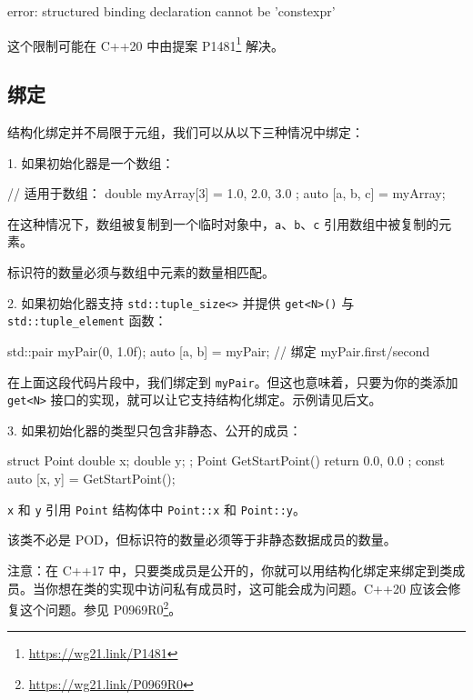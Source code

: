 \begin{codebox}
error: structured binding declaration cannot be 'constexpr'
\end{codebox}

这个限制可能在 C++20 中由提案 P1481\footnote{\url{https://wg21.link/P1481}} 解决。

\subsection{绑定}

结构化绑定并不局限于元组，我们可以从以下三种情况中绑定：

1. 如果初始化器是一个数组：

\begin{codebox}[cpp]
// 适用于数组：
double myArray[3] = { 1.0, 2.0, 3.0 };
auto [a, b, c] = myArray;
\end{codebox}

在这种情况下，数组被复制到一个临时对象中，\texttt{a}、\texttt{b}、\texttt{c} 引用数组中被复制的元素。

标识符的数量必须与数组中元素的数量相匹配。

2. 如果初始化器支持 \texttt{std::tuple\_size<>} 并提供 \texttt{get<N>()} 与 \texttt{std::tuple\_element} 函数：

\begin{codebox}[cpp]
std::pair myPair(0, 1.0f);
auto [a, b] = myPair; // 绑定 myPair.first/second
\end{codebox}

在上面这段代码片段中，我们绑定到 \texttt{myPair}。但这也意味着，只要为你的类添加 \texttt{get<N>} 接口的实现，就可以让它支持结构化绑定。示例请见后文。

3. 如果初始化器的类型只包含非静态、公开的成员：

\begin{codebox}[cpp]
struct Point
{
double x;
double y;
};
Point GetStartPoint() {
return { 0.0, 0.0 };
}
const auto [x, y] = GetStartPoint();
\end{codebox}

\texttt{x} 和 \texttt{y} 引用 \texttt{Point} 结构体中 \texttt{Point::x} 和 \texttt{Point::y}。

该类不必是 POD，但标识符的数量必须等于非静态数据成员的数量。

注意：在 C++17 中，只要类成员是公开的，你就可以用结构化绑定来绑定到类成员。当你想在类的实现中访问私有成员时，这可能会成为问题。C++20 应该会修复这个问题。参见 P0969R0\footnote{\url{https://wg21.link/P0969R0}}。

